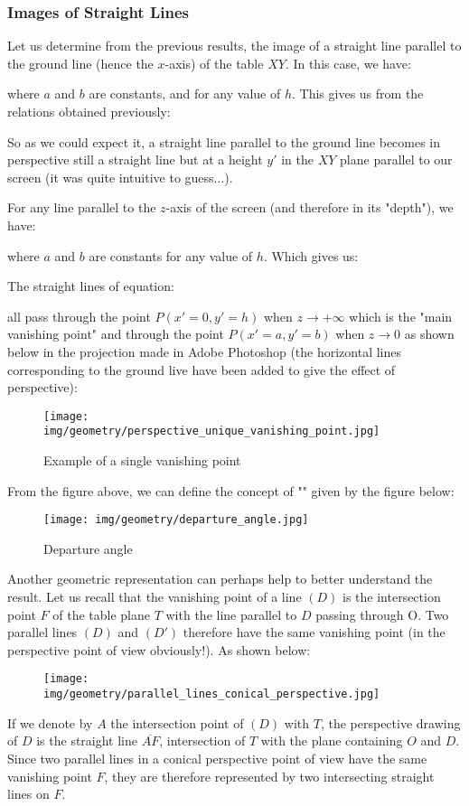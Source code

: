 	\subsubsection{Images of Straight Lines}
	Let us determine from the previous results, the image of a straight line parallel to the ground line (hence the $x$-axis) of the table $XY$. In this case, we have:
	
	where $a$ and $b$ are constants, and for any value of $h$. This gives us from the relations obtained previously:
	
	So as we could expect it, a straight line parallel to the ground line becomes in perspective still a straight line but at a height $y'$ in the $XY$ plane parallel to our screen (it was quite intuitive to guess...).

	For any line parallel to the $z$-axis of the screen (and therefore in its "depth"), we have:
	
	where $a$ and $b$ are constants for any value of $h$. Which gives us:
	
	The straight lines of equation:
	
	all pass through the point $P(x'=0,y'=h)$ when $z\rightarrow +\infty$ which is the "main vanishing point" and through the point $P(x'=a,y'=b)$ when $z\rightarrow  0$ as shown below in  the projection made in Adobe Photoshop (the horizontal lines corresponding to the ground live have been added to give the effect of perspective):
	\begin{figure}[H]
		\centering
		\texttt{[image: img/geometry/perspective\_unique\_vanishing\_point.jpg]}
		\caption{Example of a single vanishing point}
	\end{figure}
	From the figure above, we can define the concept of "" given by the figure below:
	\begin{figure}[H]
		\centering
		\texttt{[image: img/geometry/departure\_angle.jpg]}
		\caption{Departure angle}
	\end{figure}
	Another geometric representation can perhaps help to better understand the result. Let us recall that the vanishing point of a line $(D)$ is the intersection point $F$ of the table plane $T$ with the line parallel to $D$ passing through O. Two parallel lines $(D)$ and $(D')$ therefore have the same vanishing point (in the perspective point of view obviously!). As shown below:
	\begin{figure}[H]
		\centering
		\texttt{[image: img/geometry/parallel\_lines\_conical\_perspective.jpg]}
	\end{figure}
	If we denote by $A$ the intersection point of $(D)$ with $T$, the perspective drawing of $D$ is the straight line $\overline{AF}$, intersection of $T$ with the plane containing $O$ and $D$. Since two parallel lines in a conical perspective point of view have the same vanishing point $F$, they are therefore represented by two intersecting straight lines on $F$.
	
